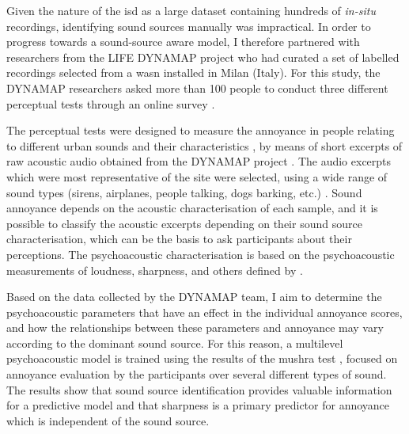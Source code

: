 Given the nature of the \gls{isd} as a large dataset containing hundreds of \emph{in-situ} recordings, identifying sound sources manually was impractical. In order to progress towards a sound-source aware model, I therefore partnered with researchers from the LIFE DYNAMAP project who had curated a set of labelled recordings selected from a \gls{wasn} installed in Milan (Italy). For this study, the DYNAMAP researchers asked more than 100 people to conduct three different perceptual tests through an online survey \citep{AlsinaPages2021Perceptual}. 

The perceptual tests were designed to measure the annoyance in people relating to different urban sounds and their characteristics \citep{LabairuTrenchs2018Noise,AlsinaPages2021Perceptual}, by means of short excerpts of raw acoustic audio obtained from the DYNAMAP project \citep{Sevillano2016DYNAMAP}. The audio excerpts which were most representative of the site were selected, using a wide range of sound types (sirens, airplanes, people talking, dogs barking, etc.) \citep{Alias2020Aggregate,Alias2020WASN}. Sound annoyance depends on the acoustic characterisation of each sample, and it is possible to classify the acoustic excerpts depending on their sound source characterisation, which can be the basis to ask participants about their perceptions. The psychoacoustic characterisation is based on the psychoacoustic measurements of loudness, sharpness, and others defined by \citet{PsychoacousticsfactsmodelsZwicker}.

Based on the data collected by the DYNAMAP team, I aim to determine the psychoacoustic parameters that have an effect in the individual annoyance scores, and how the relationships between these parameters and annoyance may vary according to the dominant sound source. For this reason, a multilevel psychoacoustic model is trained using the results of the \gls{mushra} test \citep{IRB2015Method}, focused on annoyance evaluation by the participants over several different types of sound. The results show that sound source identification provides valuable information for a predictive model and that sharpness is a primary predictor for annoyance which is independent of the sound source.


